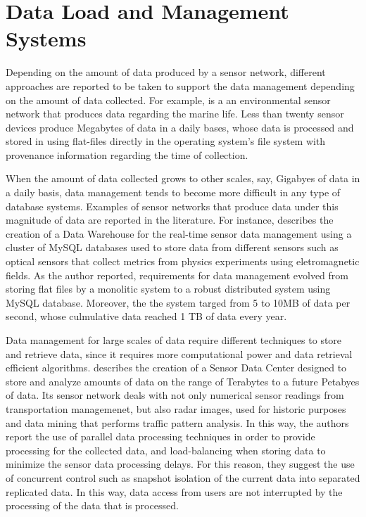 \section{Data Load and Management Systems}
\label{sec:data-load}

Depending on the amount of data produced by a sensor network, different
approaches are reported to be taken to support the data management depending on
the amount of data collected. For example, \cite{sfbeams2006} is a an
environmental sensor network that produces data regarding the marine life.
Less than twenty sensor devices produce Megabytes of data in a daily bases,
whose data is processed and stored in using flat-files directly in the
operating system's file system with provenance information regarding the time
of collection.

When the amount of data collected grows to other scales, say, Gigabyes of data
in a daily basis, data management tends to become more difficult in any type of
database systems. Examples of sensor networks that produce data under this
magnitude of data are reported in the literature. For instance, 
\cite{sn-dataware-house} describes the creation of a Data Warehouse for the
real-time sensor data management using a cluster of MySQL databases used to
store data from different sensors such as optical sensors that collect metrics
from physics experiments using eletromagnetic fields. As the author reported,
requirements for data management evolved from storing flat files by a
monolitic system to a robust distributed system using MySQL database.
Moreover, the the system targed from 5 to 10MB of data per second, whose
culmulative data reached 1 TB of data every year.

Data management for large scales of data require different techniques to store
and retrieve data, since it requires more computational power and data
retrieval efficient algorithms. \cite{sn-data-center} describes the creation of
a Sensor Data Center designed to store and analyze amounts of data on the range of
Terabytes to a future Petabyes of data. Its sensor network deals with not only
numerical sensor readings from transportation managemenet, but also radar
images, used for historic purposes and data mining that performs traffic
pattern analysis. In this way, the authors report the use of parallel data
processing techniques in order to provide processing for the collected
data, and load-balancing when storing data to minimize the sensor data
processing delays. For this reason, they suggest the use of concurrent control
such as snapshot isolation of the current data into separated replicated data.
In this way, data access from users are not interrupted by the processing of
the data that is processed.